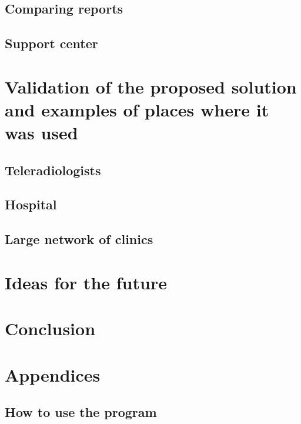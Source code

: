 \documentclass[12pt, twoside, openany]{report}
\theoremstyle{definition}
\begin{document}
\section{Comparing reports}
\section{Support center}


\chapter{Validation of the proposed solution and examples of places where it was used}
\section{Teleradiologists}
\section{Hospital}
\section{Large network of clinics}
\chapter{Ideas for the future}
\chapter{Conclusion}

\chapter {Appendices}
\section {How to use the program}


\end{document}
